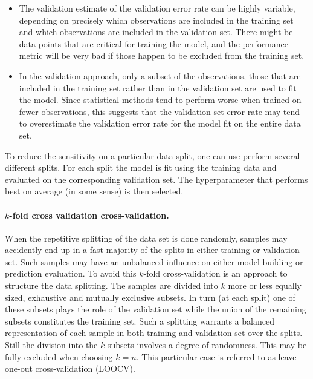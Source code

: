 \documentclass[%
oneside,                 %
final,                   %
10pt]{article}
\begin{document}
\begin{itemize}
\item The validation estimate of the validation error rate can be highly variable, depending on precisely which observations are included in the training set and which observations are included in the validation set. There might be data points that are critical for training the model, and the performance metric will be very bad if those happen to be excluded from the training set.

\item In the validation approach, only a subset of the observations, those that are included in the training set rather than in the validation set are used to fit the model. Since statistical methods tend to perform worse when trained on fewer observations, this suggests that the validation set error rate may tend to overestimate the validation error rate for the model fit on the entire data set.
\end{itemize}

\noindent
To reduce the sensitivity on a particular data split, one can use perform several different splits. For each split the model is fit using the training data and
evaluated on the corresponding validation set. The hyperparameter that performs best on average (in some sense) is then selected.


\paragraph{$k$-fold cross validation cross-validation.}
When the repetitive splitting of the data set is done randomly,
samples may accidently end up in a fast majority of the splits in
either training or validation set. Such samples may have an unbalanced
influence on either model building or prediction evaluation. To avoid
this $k$-fold cross-validation is an approach to structure the data splitting. The
samples are divided into $k$ more or less equally sized, exhaustive and
mutually exclusive subsets. In turn (at each split) one of these
subsets plays the role of the validation set while the union of the
remaining subsets constitutes the training set. Such a splitting
warrants a balanced representation of each sample in both training and
validation set over the splits. Still the division into the $k$ subsets
involves a degree of randomness. This may be fully excluded when
choosing $k=n$. This particular case is referred to as leave-one-out
cross-validation (LOOCV). 
\end{document}
